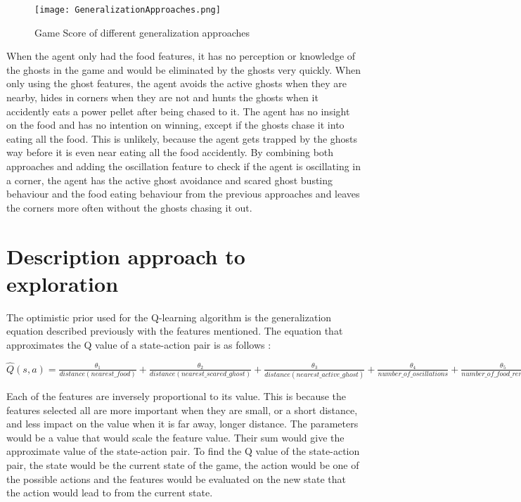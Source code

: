 \documentclass[11pt]{scrartcl}
\begin{document}
\begin{figure}[ht]
\centering	
\texttt{[image: GeneralizationApproaches.png]}	
\caption{Game Score of different generalization approaches}
\label{fig:F1}
\end{figure}

When the agent only had the food features, it has no perception or knowledge of the ghosts in the game and would be eliminated by the ghosts very quickly. When only using the ghost features, the agent avoids the active ghosts when they are nearby, hides in corners when they are not and hunts the ghosts when it accidently eats a power pellet after being chased to it. The agent has no insight on the food and has no intention on winning, except if the ghosts chase it into eating all the food. This is unlikely, because the agent gets trapped by the ghosts way before it is even near eating all the food accidently. By combining both approaches and adding the oscillation feature to check if the agent is oscillating in a corner, the agent has the active ghost avoidance and scared ghost busting behaviour and the food eating behaviour from the previous approaches and leaves the corners more often without the ghosts chasing it out.

\section{Description approach to exploration}

The optimistic prior used for the Q-learning algorithm is the generalization equation described previously with the features mentioned. The equation that approximates the Q value of a state-action pair is as follows : 

\begin{center}
$\hat{Q}(s,a) = \frac{\theta_1}{distance(nearest\_food)} + \frac{\theta_2}{distance(nearest\_scared\_ghost)} + \frac{\theta_3}{distance(nearest\_active\_ghost)} + \frac{\theta_4}{number\_of\_oscillations} + \frac{\theta_5}{number\_of\_food\_remaining}$
\end{center}

Each of the features are inversely proportional to its value. This is because the features selected all are more important when they are small, or a short distance, and less impact on the value when it is far away, longer distance. The parameters would be a value that would scale the feature value. Their sum would give the approximate value of the state-action pair. To find the Q value of the state-action pair, the state would be the current state of the game, the action would be one of the possible actions and the features would be evaluated on the new state that the action would lead to from the current state. 
\end{document}
